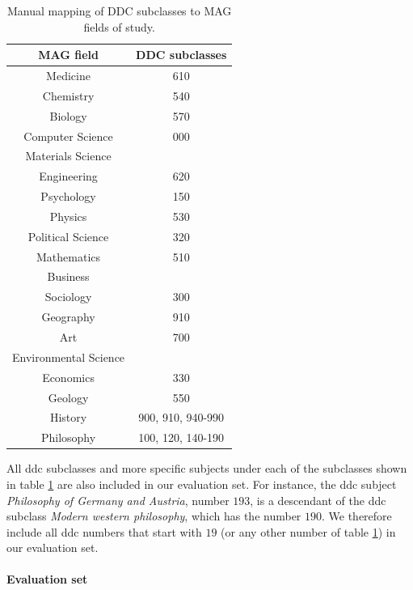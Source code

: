 \begin{table}[]
    \centering
    \begin{tabular}{|c|c|}
        \hline
        \textbf{MAG field} & \textbf{DDC subclasses} \\ \hline\hline
        Medicine & 610 \\ \hline
        Chemistry & 540 \\ \hline
        Biology & 570 \\ \hline
        Computer Science & 000 \\ \hline
        Materials Science &  \\ \hline
        Engineering & 620 \\ \hline
        Psychology & 150 \\ \hline
        Physics & 530 \\ \hline
        Political Science & 320 \\ \hline
        Mathematics & 510 \\ \hline
        Business &  \\ \hline
        Sociology & 300 \\ \hline
        Geography & 910 \\ \hline
        Art & 700 \\ \hline
        Environmental Science &  \\ \hline
        Economics & 330 \\ \hline
        Geology & 550 \\ \hline
        History & 900, 910, 940-990 \\ \hline
        Philosophy & 100, 120, 140-190 \\ \hline
    \end{tabular}
    \caption{Manual mapping of DDC subclasses to MAG fields of study.}
    \label{tab:ddc_fields}
\end{table}

All \acrshort{ddc} subclasses and more specific subjects under each of the subclasses shown in table \ref{tab:ddc_fields} are also included in our evaluation set. For instance, the \acrshort{ddc} subject \textit{Philosophy of Germany and Austria}, number $193$, is a descendant of the \acrshort{ddc} subclass \textit{Modern western philosophy}, which has the number $190$. We therefore include all \acrshort{ddc} numbers that start with $19$ (or any other number of table \ref{tab:ddc_fields}) in our evaluation set.

\paragraph{Evaluation set} \mbox{} \label{eval_ddc_results}

